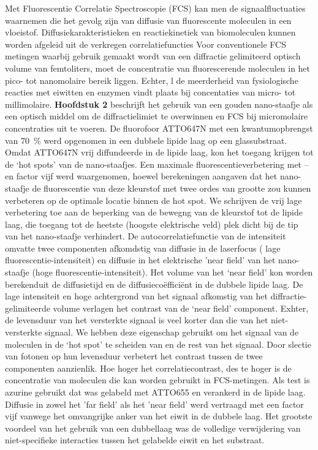 Met Fluorescentie Correlatie Spectroscopie (FCS) kan men de signaalfluctuaties waarnemen die het gevolg zijn van diffusie van fluorescente moleculen in een vloeistof. Diffusiekarakteristieken en reactiekinetiek van biomoleculen kunnen worden afgeleid uit de verkregen correlatiefuncties Voor conventionele FCS metingen waarbij gebruik gemaakt wordt van een diffractie gelimiteerd optisch volume van femtoliters, moet de concentratie
van fluorescerende moleculen in het pico- tot nanomolaire bereik liggen. Echter, l de meerderheid van fysiologische reacties met eiwitten en enzymen vindt plaats bij concentaties van micro- tot millimolaire.  \textbf{Hoofdstuk 2} beschrijft het gebruik van een gouden nano-staafje als een optisch middel  om de diffractielimiet te overwinnen en FCS bij micromolaire concentraties uit te voeren. De fluorofoor ATTO647N met een kwantumopbrengst van \SI{70}{\percent} werd opgenomen in een dubbele lipide laag op een glassubstraat. Omdat ATTO647N vrij diffundeerde in de lipide laag, kon het toegang krijgen tot de ‘hot spots’ van de nano-staafjes. Een maximale fluorescentieverbetering met –en factor vijf werd waargenomen, hoewel berekeningen aangaven dat het nano-staafje de fluorescentie van deze kleurstof met twee ordes van grootte zou kunnen verbeteren op de optimale locatie binnen de hot spot. We schrijven de vrij lage verbetering toe aan de beperking van de bewegng van de kleurstof tot de lipide laag, die toegang tot de heetste (hoogste elektrische veld) plek dicht bij de tip van het nano-staafje verhindert. De autocorrelatiefunctie van de intensiteit omvatte twee componenten afkomdstig van diffusie in de laserfocus ( lage fluorescentie-intensiteit) en diffusie in het elektrische ’near field’  van het nano-staafje (hoge fluorescentie-intensiteit). Het volume van het ‘near field’ kon worden berekenduit de diffusietijd en de diffusiecoëfficiënt in de dubbele lipide laag. De lage intensiteit en hoge achtergrond van  het signaal afkomstig van het diffractie-gelimiteerde volume verlagen het contrast van de ‘near field’ component. Exhter, de levensduur van het versterkte signaal is veel korter dan die van het niet-versterkte signaal. We hebben deze eigenschap gebruikt om het signaal van de moleculen in de ‘hot spot’ te scheiden van en de rest van het signaal. Door slectie van fotonen op hun levensduur verbetert het contrast tussen de twee componenten aanzienlik. Hoe hoger het correlatiecontrast, des te hoger is de concentratie van moleculen die kan worden gebruikt in FCS-metingen. Als test is azurine gebruikt dat was gelabeld met ATTO655 en verankerd in de lipide laag. Diffusie in zowel het ’far field’  als het ’near field’ werd vertraagd met een factor vijf vanwege het omvangrijke anker van het eiwit in de dubbele laag. Het grootste voordeel van het gebruik van een dubbellaag was de volledige verwijdering van niet-specifieke interacties tussen het gelabelde eiwit en het substraat.
 



